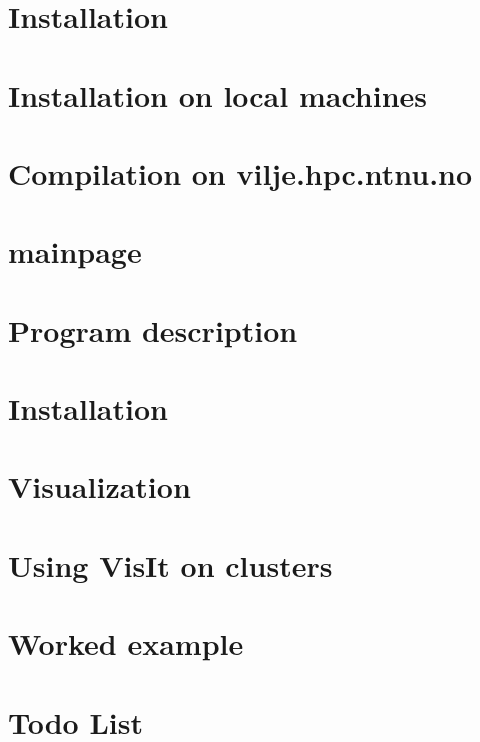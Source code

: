 \documentclass[twoside]{book}
\newcommand{\+}{\discretionary{\mbox{\scriptsize$\hookleftarrow$}}{}{}}
\begin{document}
\chapter{Installation}
\label{md_installation_instructions}
\hypertarget{md_installation_instructions}{}

\chapter{Installation on local machines}
\label{installation-local}
\hypertarget{installation-local}{}

\chapter{Compilation on vilje.\+hpc.\+ntnu.\+no}
\label{installation-vilje}
\hypertarget{installation-vilje}{}

\chapter{mainpage}
\label{md_mainpage}
\hypertarget{md_mainpage}{}

\chapter{Program description}
\label{program-structure}
\hypertarget{program-structure}{}

\chapter{Installation}
\label{md_Readme}
\hypertarget{md_Readme}{}

\chapter{Visualization}
\label{visualization-instructions}
\hypertarget{visualization-instructions}{}

\chapter{Using Vis\+It on clusters}
\label{visualization-cluster}
\hypertarget{visualization-cluster}{}

\chapter{Worked example}
\label{worked-example}
\hypertarget{worked-example}{}

\chapter{Todo List}
\label{todo}
\hypertarget{todo}{}

\end{document}
